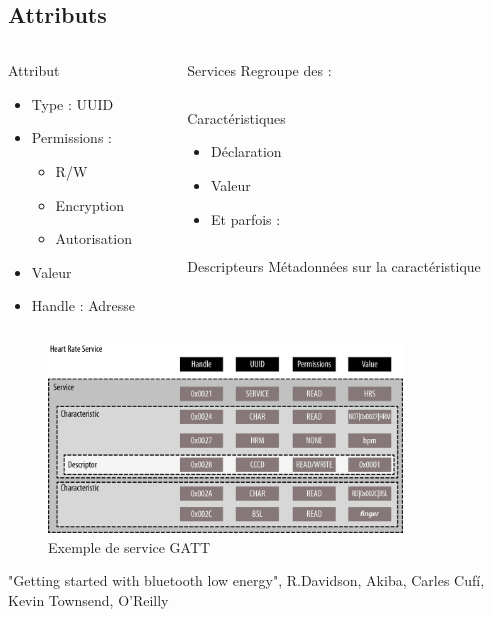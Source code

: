 \subsection{Attributs}
\begin{frame}
\begin{columns}[t]
\begin{column}{0.45\linewidth}
	\begin{block}{Attribut}
		\begin{itemize}
			\item Type : UUID
			\item Permissions : \begin{itemize}
						\item R/W
						\item Encryption
						\item Autorisation
					\end{itemize}
			\item Valeur
			\item Handle : Adresse
		\end{itemize}
	\end{block}
\end{column}
\begin{column}[t]{0.45\linewidth}

	\begin{block}{Services}
		Regroupe des :
		\begin{columns}[T]
		\begin{column}{0.90\textwidth}
		\begin{block}{Caractéristiques}
			\begin{itemize}
				\item Déclaration
				\item Valeur
				\item Et parfois :
			\end{itemize}
			\begin{columns}[T]
			\begin{column}{0.90\textwidth}
			\begin{block}{Descripteurs}
			Métadonnées sur la caractéristique
			\end{block}
			\end{column}
			\end{columns}
		\end{block}
		\end{column}
		\end{columns}
	\end{block}

\end{column}
\end{columns}
\end{frame}

\begin{frame}
	\begin{figure}
		\includegraphics[height=5cm]{gatt.png}
		\caption{Exemple de service GATT}
	\end{figure}
{\tiny "Getting started with bluetooth low energy", R.Davidson, Akiba, Carles Cufí, Kevin Townsend, O'Reilly}
\end{frame}
